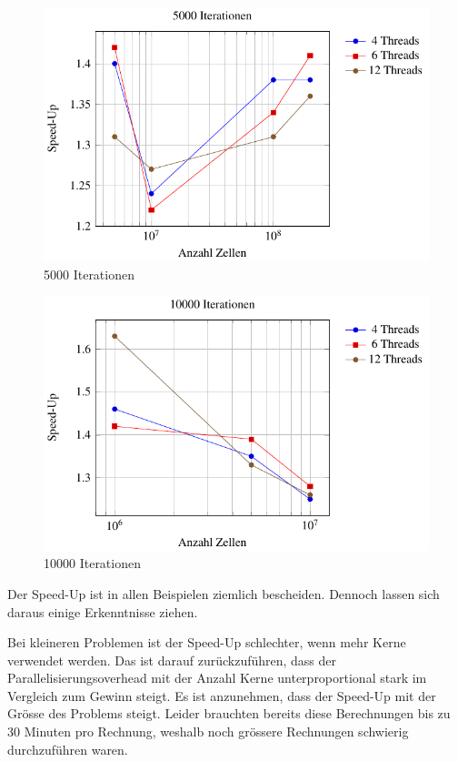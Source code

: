 	
	\begin{figure}
		\centering
		\includegraphics{papers/parallelisierung/images/speedup5000.pdf}
		\caption{5000 Iterationen}
		\label{parallelisierung:fig:Speedup5000}
	\end{figure}
	
	
	\begin{figure}
		\centering
		\includegraphics{papers/parallelisierung/images/speedup10000.pdf}
		\caption{10000 Iterationen}
		\label{parallelisierung:fig:Speedup10000}
	\end{figure}
	

Der Speed-Up ist in allen Beispielen ziemlich bescheiden.
Dennoch lassen sich daraus einige Erkenntnisse ziehen.

Bei kleineren Problemen ist der Speed-Up schlechter, wenn mehr Kerne verwendet werden.
Das ist darauf zurückzuführen, dass der Parallelisierungsoverhead mit der Anzahl Kerne unterproportional stark im Vergleich zum Gewinn steigt.
Es ist anzunehmen, dass der Speed-Up mit der Grösse des Problems steigt.
Leider brauchten bereits diese Berechnungen bis zu 30 Minuten pro Rechnung, weshalb noch grössere Rechnungen schwierig durchzuführen waren.


